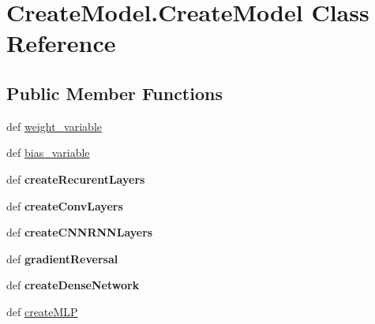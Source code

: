 \hypertarget{classCreateModel_1_1CreateModel}{\section{Create\-Model.\-Create\-Model Class Reference}
\label{classCreateModel_1_1CreateModel}
}
\subsection*{Public Member Functions}
\begin{DoxyCompactItemize}
\item 
def \hyperlink{classCreateModel_1_1CreateModel_ae868f99ce147ab3b0ff73c515006ba16}{weight\-\_\-variable}
\item 
def \hyperlink{classCreateModel_1_1CreateModel_a9cd7bb38d38886a36f8036aec997b566}{bias\-\_\-variable}
\item 
\hypertarget{classCreateModel_1_1CreateModel_afe92bae79b5fd702e02a43a5936df994}{def {\bfseries create\-Recurent\-Layers}}\label{classCreateModel_1_1CreateModel_afe92bae79b5fd702e02a43a5936df994}

\item 
\hypertarget{classCreateModel_1_1CreateModel_ae75976731946bd47ca90a966f2a8e261}{def {\bfseries create\-Conv\-Layers}}\label{classCreateModel_1_1CreateModel_ae75976731946bd47ca90a966f2a8e261}

\item 
\hypertarget{classCreateModel_1_1CreateModel_a86e1bd0898957507096454cd034a89dc}{def {\bfseries create\-C\-N\-N\-R\-N\-N\-Layers}}\label{classCreateModel_1_1CreateModel_a86e1bd0898957507096454cd034a89dc}

\item 
\hypertarget{classCreateModel_1_1CreateModel_a34c6677df45275266012e10d36e0c9c2}{def {\bfseries gradient\-Reversal}}\label{classCreateModel_1_1CreateModel_a34c6677df45275266012e10d36e0c9c2}

\item 
\hypertarget{classCreateModel_1_1CreateModel_a0cec7ff4bfd516b73c48f92d321bd23d}{def {\bfseries create\-Dense\-Network}}\label{classCreateModel_1_1CreateModel_a0cec7ff4bfd516b73c48f92d321bd23d}

\item 
\hypertarget{classCreateModel_1_1CreateModel_a7a829ae167a06dbcfec7c16e39e4690e}{def \hyperlink{classCreateModel_1_1CreateModel_a7a829ae167a06dbcfec7c16e39e4690e}{create\-M\-L\-P}}\label{classCreateModel_1_1CreateModel_a7a829ae167a06dbcfec7c16e39e4690e}


\end{DoxyCompactItemize}
